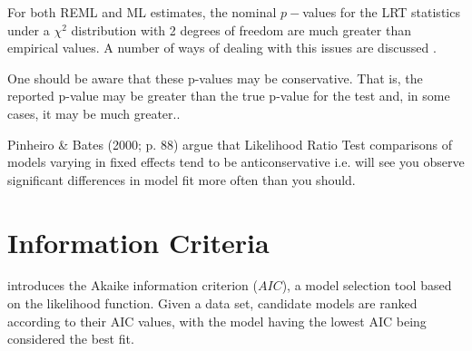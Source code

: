 \documentclass[12pt, a4paper]{report}
\theoremstyle{plain}
\theoremstyle{definition}
\theoremstyle{remark}
\begin{document}

For both REML and ML estimates, the nominal $p-$values for the LRT statistics under a $\chi^2$ distribution with 2 degrees of freedom are much greater than empirical values. A number of ways of dealing with this issues are discussed \citep[pg.86]{pb}.

One should be aware that these p-values may be conservative. That is, the reported p-value may be greater than the true p-value for the test and, in some cases, it may be much greater.\citep[pg.87]{pb}.



Pinheiro \& Bates (2000; p. 88) argue that Likelihood Ratio Test comparisons of models varying in fixed effects tend to be anticonservative i.e. 
will see you observe significant differences in model fit more often than you should. 




\section{Information Criteria}

\citet{akaike} introduces the Akaike information criterion ($AIC$), a model selection tool based on the likelihood function. Given a data set, candidate models are ranked according to their AIC values, with the model having the lowest AIC being considered the best fit.
\end{document}
